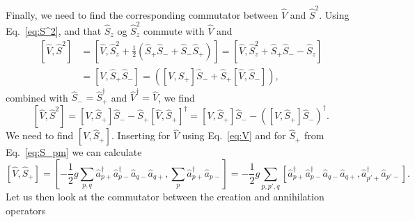 \documentclass[a4paper,11pt,twoside]{article}
\begin{document}
Finally, we need to find the corresponding commutator between
$\hat V$ and $\hat S^2$. Using Eq.~\eqref{eq:S^2}, and that $\hat S_z$ og $\hat S_z^2$ commute with  $\hat V$ and
\begin{align*}
\left[ \hat V, \hat S^2 \right]
%
&= \left[ \hat V, \hat S_z^2 + \frac{1}{2} \left( \hat S_+ \hat S_- + \hat S_- \hat S_+ \right) \right]
%
= \left[ \hat V, \hat S_z^2 + \hat S_+ \hat S_- - \hat S_z \right] \\
%
&= \left[ V, \hat S_+ \hat S_- \right]
%
= \left( \left[ V, \hat S_+ \right] \hat S_- + \hat S_+ \left[ \hat V, \hat S_- \right] \right),
\end{align*}
combined with  $\hat S_- = \hat S_+^\dagger$ and  $\hat V^\dagger = \hat V$,  we find
\[ \left[ \hat V, \hat S^2 \right] =
\left[ V, \hat S_+ \right] \hat S_- - \hat S_+ \left[ \hat V, \hat S_+ \right]^\dagger
= \left[ V, \hat S_+ \right] \hat S_- - \left( \left[ V, \hat S_+ \right] \hat S_- \right)^\dagger. \]
%
We need to find  $[V, \hat S_+]$. Inserting for $\hat V$ using Eq.~\eqref{eq:V} and for $\hat S_+$ from Eq.~\eqref{eq:S_pm} we can calculate
\[ \left[ \hat V, \hat S_+ \right] = \left[ -\frac{1}{2} g \sum_{p,q} \hat a_{p+}^\dagger \hat a_{p-}^\dagger \hat a_{q-} \hat a_{q+}, \sum_p \hat a_{p+}^\dagger \hat a_{p-} \right]
%
= -\frac{1}{2} g \sum_{p,p',q} \left[ \hat a_{p+}^\dagger \hat a_{p-}^\dagger \hat a_{q-} \hat a_{q+}, \hat a_{p'+}^\dagger \hat a_{p'-} \right] . \]
Let us then look at the commutator between the creation and annihilation operators
\end{document}
